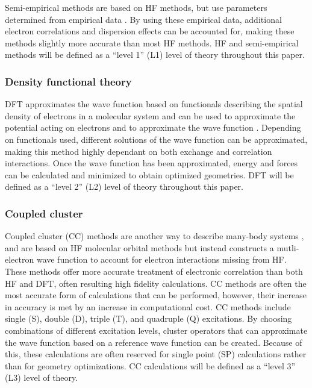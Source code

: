 \documentclass[preprint, 11pt]{elsarticle} %
\begin{document}
Semi-empirical methods are based on HF methods, but use parameters determined from empirical data \cite{SEMethods:2014}. 
By using these empirical data, additional electron correlations and dispersion effects can be accounted for, making these methods slightly more accurate than most HF methods.
HF and semi-empirical methods will be defined as a ``level 1'' (L1) level of theory throughout this paper. 

\subsubsection{Density functional theory}

DFT approximates the wave function based on functionals describing the spatial density of electrons in a molecular system and can be used to approximate the potential acting on electrons and to approximate the wave function \cite{DFT:1964,dft:1994}.
Depending on functionals used, different solutions of the wave function can be approximated, making this method highly dependant on both exchange and correlation interactions. 
Once the wave function has been approximated, energy and forces can be calculated and minimized to obtain optimized geometries.
DFT will be defined as a ``level 2'' (L2) level of theory throughout this paper.

\subsubsection{Coupled cluster}

Coupled cluster (CC) methods are another way to describe many-body systems \cite{CC:2002}, and are based on HF molecular orbital methods but instead constructs a mutli-electron wave function to account for electron interactions missing from HF.
These methods offer more accurate treatment of electronic correlation than both HF and DFT, often resulting high fidelity calculations. 
CC methods are often the most accurate form of calculations that can be performed, however, their increase in accuracy is met by an increase in computational cost.
CC methods include single (S), double (D), triple (T), and quadruple (Q) excitations.  
By choosing combinations of different excitation levels, cluster operators that can approximate the wave function based on a reference wave function can be created.
Because of this, these calculations are often reserved for single point (SP) calculations rather than for geometry optimizations.
CC calculations will be defined as a ``level 3'' (L3) level of theory.
\end{document}
